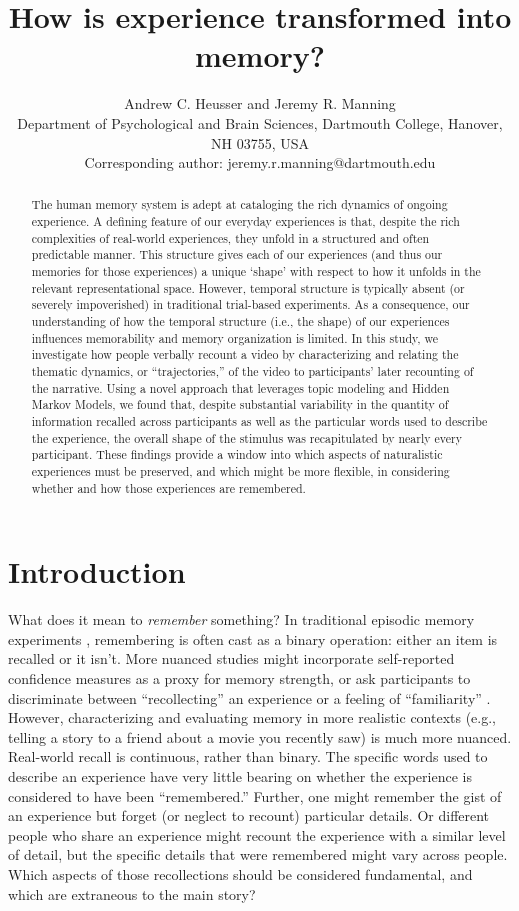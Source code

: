 \documentclass{article}
\title{How is experience transformed into memory?}
\author{Andrew C. Heusser and Jeremy R. Manning\\Department of Psychological and Brain Sciences, Dartmouth College, Hanover, NH 03755, USA\\Corresponding author: jeremy.r.manning@dartmouth.edu}
\begin{document}
\maketitle

\begin{abstract}
The human memory system is adept at cataloging the rich dynamics of ongoing experience. A defining feature of our everyday experiences is that, despite the rich complexities of real-world experiences, they unfold in a structured and often predictable manner. This structure gives each of our experiences (and thus our memories for those experiences) a unique `shape' with respect to how it unfolds in the relevant representational space.  However, temporal structure is typically absent (or severely impoverished) in traditional trial-based  experiments. As a consequence, our understanding of how the temporal structure (i.e., the shape) of our experiences influences memorability and memory organization is limited. In this study, we investigate how people verbally recount a video by characterizing and relating the thematic dynamics, or ``trajectories,'' of the video to participants' later recounting of the narrative. Using a novel approach that leverages topic modeling and Hidden Markov Models, we found that, despite substantial variability in the quantity of information recalled across participants as well as the particular words used to describe the experience, the overall shape of the stimulus was recapitulated by nearly every participant. These findings provide a window into which aspects of naturalistic experiences must be preserved, and which might be more flexible, in considering whether and how those experiences are remembered.
\end{abstract}

\section*{Introduction}

What does it mean to \textit{remember} something? In traditional episodic memory experiments \citep[e.g., list-learning or trial-based experiments;][]{Murd62a, Kaha96}, remembering is often cast as a binary operation: either an item is recalled or it isn't. More nuanced studies might incorporate self-reported confidence measures as a proxy for memory strength, or ask participants to discriminate between ``recollecting'' an experience or a feeling of ``familiarity'' \citep{Yone02}. However, characterizing and evaluating memory in more realistic contexts (e.g., telling a story to a friend about a movie you recently saw) is much more nuanced. Real-world recall is continuous, rather than binary.  The specific words used to describe an experience have very little bearing on whether the experience is considered to have been ``remembered.''  Further, one might remember the gist of an experience but forget (or neglect to recount) particular details.  Or different people who share an experience might recount the experience with a similar level of detail, but the specific details that were remembered might vary across people.  Which aspects of those recollections should be considered fundamental, and which are extraneous to the main story?
\end{document}
